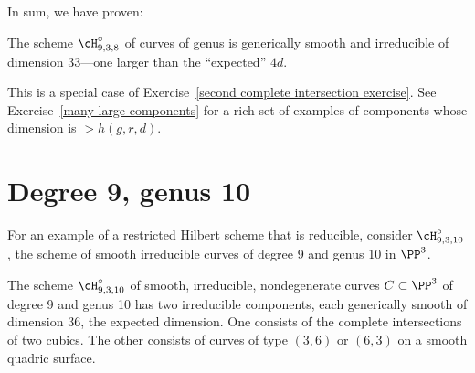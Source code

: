 In sum, we have proven:
\begin{proposition}
 The scheme $\cH^\circ_{9,3,8}$ of curves of genus  is generically smooth and irreducible of dimension 33---one larger than the ``expected'' $4d$.
\end{proposition}
This is a special case of Exercise~\ref{second complete intersection exercise}.
See Exercise~\ref{many large components} for a rich set of examples of components whose dimension
is $>h(g,r,d)$.


\section{Degree 9, genus 10}\label{deg9 section}

For an example of a restricted Hilbert scheme that is reducible, consider $\cH^\circ_{9,3,10}$, the
scheme of smooth irreducible curves of degree 9 and genus 10 in $\PP^{3}$.

\begin{proposition}
 The scheme $\cH^\circ_{9,3,10}$ of smooth, irreducible, nondegenerate curves $C \subset \PP^3$ of degree 9 and genus 10 has two irreducible components, each generically smooth of dimension 36, the expected dimension. One consists of the complete intersections of two cubics. The other consists of curves of type $(3,6)$ or $(6,3)$ on a smooth quadric surface. \end{proposition}

